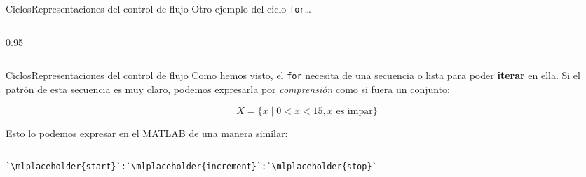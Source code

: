 \documentclass[spanish, c, handout]{beamer}
\newcommand{\matlab}[1]{\lstinline[style=Matlab-editor]!#1!}
\begin{document}
\begin{frame}{Ciclos}{Representaciones del control de flujo}    
    Otro ejemplo del ciclo \matlab{for}\dots
    
    \bigskip
    \begin{columns}
        \begin{column}{0.95\linewidth}
            
        \end{column}
    \end{columns}
\end{frame}

\begin{frame}[fragile]{Ciclos}{Representaciones del control de flujo}
    Como hemos visto, el \matlab{for} necesita de una \alert{secuencia} o \alert{lista} para poder \textbf{iterar} en ella.
    Si el patrón de esta secuencia es muy claro, podemos expresarla por \textit{comprensión} como si fuera un conjunto:

    $$X = \{x \mid 0 < x < 15, x \text{ es impar}\}$$

    Esto lo podemos expresar en el MATLAB de una manera similar:

    \begin{columns}
        \begin{column}{0.95\linewidth}
                \begin{lstlisting}[frame=none, numbers=none]
                        `\mlplaceholder{start}`:`\mlplaceholder{increment}`:`\mlplaceholder{stop}`
                \end{lstlisting}
    \bigskip

    
        \end{column}
    \end{columns}
\end{frame}




\end{document}
